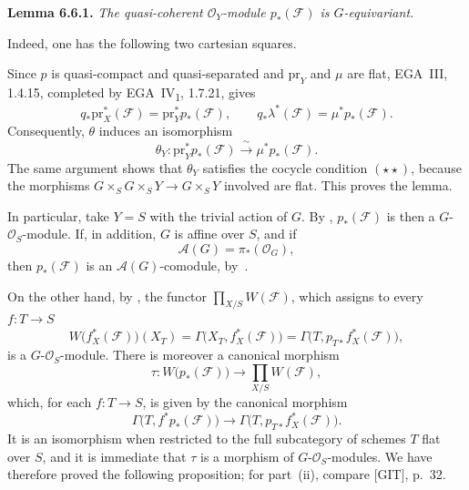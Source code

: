 \medskip
\noindent{}\textbf{Lemma 6.6.1.}
\textit{The quasi-coherent \(\mathcal O_Y\)-module
\(p_*(\mathcal F)\) is \(G\)-equivariant.}

Indeed, one has the following two cartesian squares.

\begin{figure}[H]
  \centering
  
  \label{fig:sga3-exp1-p045-base-change-squares}
\end{figure}

Since \(p\) is quasi-compact and quasi-separated and
\(\mathrm{pr}_Y\) and \(\mu\) are flat, EGA~III, 1.4.15, completed by
EGA~IV\textsubscript{1}, 1.7.21, gives
\[
  q_*\mathrm{pr}_X^*(\mathcal F)
    =\mathrm{pr}_Y^*p_*(\mathcal F),
  \qquad
  q_*\lambda^*(\mathcal F)
    =\mu^*p_*(\mathcal F).
\]
Consequently, \(\theta\) induces an isomorphism
\[
  \theta_Y:\mathrm{pr}_Y^*p_*(\mathcal F)
  \xrightarrow{\ \sim\ }\mu^*p_*(\mathcal F).
\]
The same argument shows that \(\theta_Y\) satisfies the cocycle
condition  \((\star\star)\), because the morphisms
\(G\times_SG\times_SY\to G\times_SY\) involved are flat. This proves
the lemma.

In particular, take \(Y=S\) with the trivial action of \(G\). By
, \(p_*(\mathcal F)\) is then a
\(G\)-\(\mathcal O_S\)-module. If, in addition, \(G\) is affine over
\(S\), and if
\[
  \mathscr A(G)=\pi_*(\mathcal O_G),
\]
then \(p_*(\mathcal F)\) is an \(\mathscr A(G)\)-comodule, by~.

On the other hand, by , the functor
\(\prod_{X/S}W(\mathcal F)\), which assigns to every \(f:T\to S\)
\[
  W\bigl(f_X^*(\mathcal F)\bigr)(X_T)
  =\Gamma\bigl(X_T,f_X^*(\mathcal F)\bigr)
  =\Gamma\bigl(T,p_{T*}f_X^*(\mathcal F)\bigr),
\]
is a \(G\)-\(\mathcal O_S\)-module. There is moreover a canonical
morphism
\[
  \tau:W\bigl(p_*(\mathcal F)\bigr)
  \longrightarrow\prod_{X/S}W(\mathcal F),
\]
which, for each \(f:T\to S\), is given by the canonical morphism
\[
  \Gamma\bigl(T,f^*p_*(\mathcal F)\bigr)
  \longrightarrow
  \Gamma\bigl(T,p_{T*}f_X^*(\mathcal F)\bigr).
\]
It is an isomorphism when restricted to the full subcategory of schemes
\(T\) flat over \(S\), and it is immediate that \(\tau\) is a morphism
of \(G\)-\(\mathcal O_S\)-modules. We have therefore proved the
following proposition; for part~(ii), compare [GIT], p.~32.

